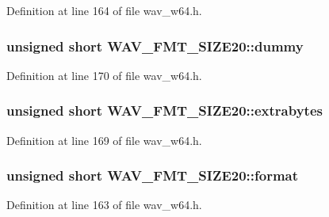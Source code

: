 Definition at line 164 of file wav\+\_\+w64.\+h.

\subsubsection[{\texorpdfstring{dummy}{dummy}}]{\setlength{\rightskip}{0pt plus 5cm}unsigned short W\+A\+V\+\_\+\+F\+M\+T\+\_\+\+S\+I\+Z\+E20\+::dummy}\hypertarget{struct_w_a_v___f_m_t___s_i_z_e20_adc66c80f09c595bd35fe128363321c20}{}\label{struct_w_a_v___f_m_t___s_i_z_e20_adc66c80f09c595bd35fe128363321c20}


Definition at line 170 of file wav\+\_\+w64.\+h.

\subsubsection[{\texorpdfstring{extrabytes}{extrabytes}}]{\setlength{\rightskip}{0pt plus 5cm}unsigned short W\+A\+V\+\_\+\+F\+M\+T\+\_\+\+S\+I\+Z\+E20\+::extrabytes}\hypertarget{struct_w_a_v___f_m_t___s_i_z_e20_ac7d5f93e88fa37f62be75275a2f7b850}{}\label{struct_w_a_v___f_m_t___s_i_z_e20_ac7d5f93e88fa37f62be75275a2f7b850}


Definition at line 169 of file wav\+\_\+w64.\+h.

\subsubsection[{\texorpdfstring{format}{format}}]{\setlength{\rightskip}{0pt plus 5cm}unsigned short W\+A\+V\+\_\+\+F\+M\+T\+\_\+\+S\+I\+Z\+E20\+::format}\hypertarget{struct_w_a_v___f_m_t___s_i_z_e20_a751cae567750e9d51fa4c45e73547c72}{}\label{struct_w_a_v___f_m_t___s_i_z_e20_a751cae567750e9d51fa4c45e73547c72}


Definition at line 163 of file wav\+\_\+w64.\+h.

